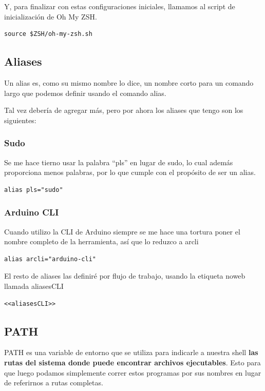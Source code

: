 \documentclass[11pt]{article}
\begin{document}
Y, para finalizar con estas configuraciones iniciales, llamamos al script de inicialización de Oh My ZSH.

\begin{verbatim}
source $ZSH/oh-my-zsh.sh

\end{verbatim}
\subsection{Aliases}
\label{sec:orge6b019f}

Un alias es, como su mismo nombre lo dice, un nombre corto para un comando largo que podemos definir usando el comando alias.

Tal vez debería de agregar más, pero por ahora los aliases que tengo son los siguientes:
\subsubsection{Sudo}
\label{sec:org140644f}

Se me hace tierno usar la palabra ``pls'' en lugar de sudo, lo cual además proporciona menos palabras, por lo que cumple con el propósito de ser un alias.

\begin{verbatim}
alias pls="sudo"
\end{verbatim}
\subsubsection{Arduino CLI}
\label{sec:org7106972}

Cuando utilizo la CLI de Arduino siempre se me hace una tortura poner el nombre completo de la herramienta, así que lo reduzco a arcli

\begin{verbatim}
alias arcli="arduino-cli"

\end{verbatim}

El resto de aliases las definiré por flujo de trabajo, usando la etiqueta noweb llamada aliasesCLI

\begin{verbatim}
<<aliasesCLI>>
\end{verbatim}
\subsection{PATH}
\label{sec:org46ad0e5}

PATH es una variable de entorno que se utiliza para indicarle a nuestra shell \textbf{las rutas del sistema donde puede encontrar archivos ejecutables}. Esto para que luego podamos simplemente correr estos programas por sus nombres en lugar de referirnos a rutas completas.
\end{document}
